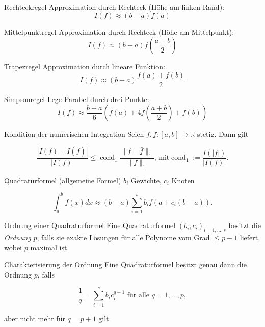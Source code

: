 
\begin{flashcard}[Definition]{Rechteckregel}
Approximation durch Rechteck (Höhe am linken Rand):
$$ I(f) \approx (b - a) f(a) $$
\end{flashcard}

\begin{flashcard}[Definition]{Mittelpunktregel}
Approximation durch Rechteck (Höhe am Mittelpunkt):
$$ I(f) \approx (b - a) f\left(\frac{a + b}{2}\right) $$
\end{flashcard}

\begin{flashcard}[Definition]{Trapezregel}
Approximation durch lineare Funktion:
$$ I(f) \approx (b - a) \frac{f(a) + f(b)}{2} $$
\end{flashcard}

\begin{flashcard}[Definition]{Simpsonregel}
Lege Parabel durch drei Punkte:
$$ I(f) \approx \frac{b-a}{6} \left( f(a) + 4 f\left(\frac{a+b}{2}\right) + f(b) \right) $$
\end{flashcard}

\begin{flashcard}[Ungleichung]{Kondition der numerischen Integration}
Seien $\bar{f}, f : [a, b] \rightarrow \mathbb{R}$ stetig. Dann gilt

$$ \frac{|I(f) - I(\bar{f})|}{|I(f)|} \leq \operatorname{cond}_1 \frac{\|f-\bar{f}\|_1}{\|f\|_1}, \, \text{mit} \operatorname{cond}_1 := \frac{I(|f|)}{|I(f)|}.$$
\end{flashcard}

\begin{flashcard}[Definition]{Quadraturformel (allgemeine Formel)}
$b_i$ Gewichte, $c_i$ Knoten

$$ \int_a^b f(x) dx \approx (b - a) \sum_{i=1}^{s} b_i f(a + c_i (b - a)). $$
\end{flashcard}

\begin{flashcard}[Definition]{Ordnung einer Quadraturformel}
	Eine Quadraturformel $(b_i, c_i)_{i=1,\ldots,s}$ besitzt die \emph{Ordnung} $p$, falls sie exakte Lösungen für alle Polynome vom Grad $\leq p - 1$ liefert, wobei $p$ maximal ist.
\end{flashcard}

\begin{flashcard}[Satz]{Charakterisierung der Ordnung}
Eine Quadraturformel besitzt genau dann die Ordnung $p$, falls

$$ \frac{1}{q} = \sum_{i=1}^s b_i c_i^{q-1} \text{ für alle } q = 1, \ldots, p,$$

aber nicht mehr für $ q = p + 1$ gilt.
\end{flashcard}
